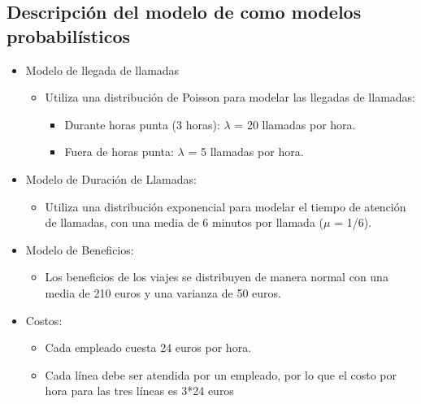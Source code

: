 \documentclass{article}
\begin{document}
			\subsection*{Descripción del modelo de como modelos probabilísticos}
				\begin{itemize}
					\item Modelo de llegada de llamadas
						\begin{itemize}
							\item Utiliza una distribución de Poisson para modelar las llegadas de llamadas:
								\begin{itemize}
									\item Durante horas punta (3 horas): $\lambda$ = 20 llamadas por hora.
									\item Fuera de horas punta: $\lambda$ = 5 llamadas por hora.
								\end{itemize}
							\end{itemize}
					\item Modelo de Duración de Llamadas:
						\begin{itemize}
							\item Utiliza una distribución exponencial para modelar el tiempo de atención de llamadas, con una media de 6 minutos por llamada ($\mu$ = 1/6).
						\end{itemize}
					\item Modelo de Beneficios:
						\begin{itemize}
							\item Los beneficios de los viajes se distribuyen de manera normal con una media de 210 euros y una varianza de 50 euros.
						\end{itemize}
					\item Costos:
						\begin{itemize}
							\item Cada empleado cuesta 24 euros por hora.
							\item Cada línea debe ser atendida por un empleado, por lo que el costo por hora para las tres líneas es 3*24 euros
						\end{itemize}
				\end{itemize}
						
\end{document}
